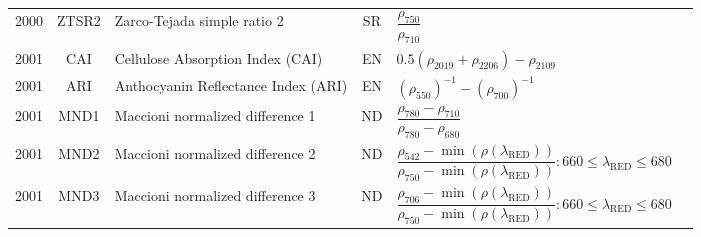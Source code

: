\documentclass[10pt]{article}
\begin{document}
\begin{ThreePartTable}
\begin{longtable}{c c m{2.3in} c M{2.8in} M{1.5in}}
  2000 & ZTSR2   & Zarco-Tejada simple ratio 2                                                    & SR & $\dfrac{\rho_{750}}{\rho_{710}}$                                                                                                                                                                                                                                                        & \citet{Zarco-Tejada2000b}                           \\
  2001 & CAI     & Cellulose Absorption Index (CAI)                                               & EN & $0.5(\rho_{2019}+\rho_{2206})-\rho_{2109}$                                                                                                                                                                                                                                              & \citet{Daughtry2001}                                \\
  2001 & ARI     & Anthocyanin Reflectance Index (ARI)                                            & EN & $(\rho_{550})^{-1}-(\rho_{700})^{-1}$                                                                                                                                                                                                                                                   & \citet{Gitelson2001}                                \\
  2001 & MND1    & Maccioni normalized difference 1                                               & ND & $\dfrac{\rho_{780}-\rho_{710}}{\rho_{780}-\rho_{680}}$                                                                                                                                                                                                                                  & \citet{Maccioni2001,Datt1999b}                      \\
  2001 & MND2    & Maccioni normalized difference 2                                               & ND & $\dfrac{\rho_{542}-\min(\rho(\lambda_\text{RED}))}{\rho_{750}-\min(\rho(\lambda_\text{RED}))} : 660\le\lambda_\text{RED}\le680$                                                                                                                                                         & \citet{Maccioni2001}                                \\
  2001 & MND3    & Maccioni normalized difference 3                                               & ND & $\dfrac{\rho_{706}-\min(\rho(\lambda_\text{RED}))}{\rho_{750}-\min(\rho(\lambda_\text{RED}))} : 660\le\lambda_\text{RED}\le680$                                                                                                                                                         & \citet{Maccioni2001}                                \\

\end{longtable}
\end{ThreePartTable}
\end{document}
